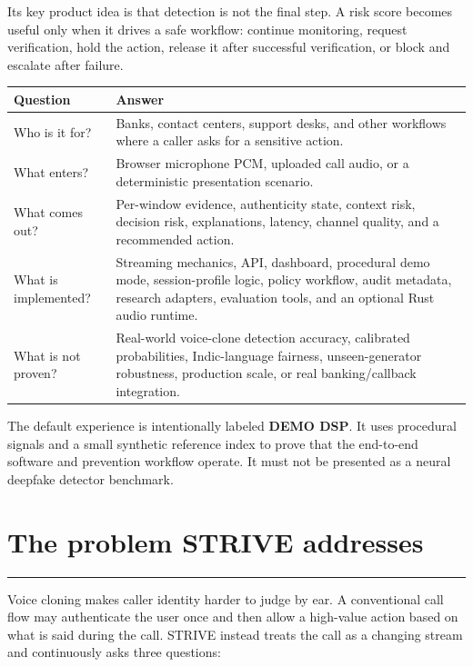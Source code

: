 \documentclass[10pt,a4paper]{article}
\newcommand{\sectionrule}{\vspace{-2mm}\textcolor{blue}{\rule{22mm}{1.2pt}}\vspace{2mm}}
\newcommand{\callout}[2]{\vspace{2mm}\noindent\fcolorbox{#1}{paper}{\parbox{0.94\linewidth}{\textbf{\textcolor{#1}{#2}}}}\vspace{2mm}}
\begin{document}
Its key product idea is that detection is not the final step. A risk score becomes useful only when it drives a safe workflow: continue monitoring, request verification, hold the action, release it after successful verification, or block and escalate after failure.

\callout{blue}{Core principle: authenticity risk, business-context risk, and the final decision risk are deliberately separate. A noisy channel is weak evidence, not proof of a fake voice. A low acoustic score is not identity verification.}

\begin{tabularx}{\linewidth}{@{}L{36mm}Y@{}}
\toprule
\textbf{Question} & \textbf{Answer}\\
\midrule
Who is it for? & Banks, contact centers, support desks, and other workflows where a caller asks for a sensitive action.\\
What enters? & Browser microphone PCM, uploaded call audio, or a deterministic presentation scenario.\\
What comes out? & Per-window evidence, authenticity state, context risk, decision risk, explanations, latency, channel quality, and a recommended action.\\
What is implemented? & Streaming mechanics, API, dashboard, procedural demo mode, session-profile logic, policy workflow, audit metadata, research adapters, evaluation tools, and an optional Rust audio runtime.\\
What is not proven? & Real-world voice-clone detection accuracy, calibrated probabilities, Indic-language fairness, unseen-generator robustness, production scale, or real banking/callback integration.\\
\bottomrule
\end{tabularx}

The default experience is intentionally labeled \textbf{DEMO DSP}. It uses procedural signals and a small synthetic reference index to prove that the end-to-end software and prevention workflow operate. It must not be presented as a neural deepfake detector benchmark.

\section{The problem STRIVE addresses}
\sectionrule

Voice cloning makes caller identity harder to judge by ear. A conventional call flow may authenticate the user once and then allow a high-value action based on what is said during the call. STRIVE instead treats the call as a changing stream and continuously asks three questions:
\end{document}
